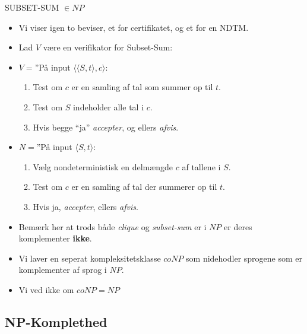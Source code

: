\begin{frame}[allowframebreaks]
	\begin{theorem}
		SUBSET-SUM $\in NP$
	\end{theorem}

	\begin{itemize}
		\item Vi viser igen to beviser, et for certifikatet, og et for en NDTM.
		\item Lad $V$ være en verifikator for Subset-Sum:

		\item $V =$''På input \(\langle \langle S, t \rangle, c \rangle\):
		      \begin{enumerate}
			      \item Test om $c$ er en samling af tal som summer op til $t$.
			      \item Test om $S$ indeholder alle tal i $c$.
			      \item Hvis begge ``ja'' \textit{accepter}, og ellers \textit{afvis}.
		      \end{enumerate}
		\item $N =$''På input \(\langle S, t \rangle\):
		      \begin{enumerate}
			      \item Vælg nondeterministisk en delmængde $c$ af tallene i $S$.
			      \item Test om $c$ er en samling af tal der summerer op til $t$.
			      \item Hvis ja, \textit{accepter}, ellers \textit{afvis}.
		      \end{enumerate}
		\item Bemærk her at trods både \textit{clique} og \textit{subset-sum} er i $NP$ er deres komplementer \textbf{ikke}.
		\item Vi laver en seperat kompleksitetsklasse $coNP$ som nidehodler sprogene som er komplementer af sprog i $NP$.
		\item Vi ved ikke om $coNP = NP$
	\end{itemize}
\end{frame}

\subsection{NP-Komplethed}%
\label{subsec:npcompleteness}

